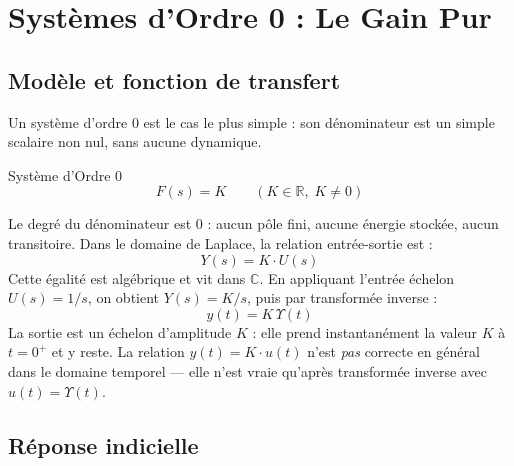 \documentclass[11pt,a4paper]{report}
\begin{document}
\section{Systèmes d'Ordre 0 : Le Gain Pur}

\subsection{Modèle et fonction de transfert}

Un système d'ordre 0 est le cas le plus simple : son dénominateur est un simple scalaire non nul, sans aucune dynamique.

\begin{defbox}{Système d'Ordre 0}
\[
  F(s) = K \qquad (K \in \mathbb{R},\; K \neq 0)
\]
\end{defbox}

Le degré du dénominateur est $0$ : aucun pôle fini, aucune énergie stockée, aucun transitoire. Dans le domaine de Laplace, la relation entrée-sortie est :
\[ Y(s) = K \cdot U(s) \]
Cette égalité est algébrique et vit dans $\mathbb{C}$. En appliquant l'entrée échelon $U(s) = 1/s$, on obtient $Y(s) = K/s$, puis par transformée inverse :
\[ y(t) = K\,\Upsilon(t) \]
La sortie est un échelon d'amplitude $K$ : elle prend instantanément la valeur $K$ à $t=0^+$ et y reste. La relation $y(t) = K\cdot u(t)$ n'est \emph{pas} correcte en général dans le domaine temporel — elle n'est vraie qu'après transformée inverse avec $u(t)=\Upsilon(t)$.

\subsection{Réponse indicielle}

\begin{center}
\end{center}
\end{document}
